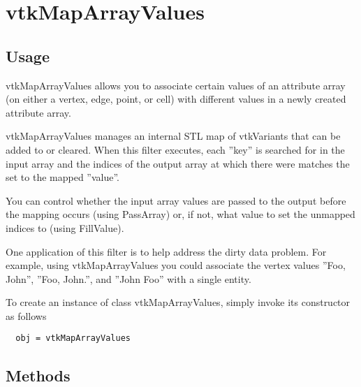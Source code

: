 \section{vtkMapArrayValues}

\subsection{Usage}

 vtkMapArrayValues allows you to associate certain values of an attribute array
 (on either a vertex, edge, point, or cell) with different values in a
 newly created attribute array. 

 vtkMapArrayValues manages an internal STL map of vtkVariants that can be added to
 or cleared. When this filter executes, each ''key'' is searched for in the
 input array and the indices of the output array at which there were matches
 the set to the mapped ''value''.

 You can control whether the input array values are passed to the output
 before the mapping occurs (using PassArray) or, if not, what value to set 
 the unmapped indices to (using FillValue). 

 One application of this filter is to help address the dirty data problem.
 For example, using vtkMapArrayValues you could associate the vertex values 
 ''Foo, John'', ''Foo, John.'', and ''John Foo'' with a single entity.

To create an instance of class vtkMapArrayValues, simply
invoke its constructor as follows
\begin{verbatim}
  obj = vtkMapArrayValues
\end{verbatim}
\subsection{Methods}


